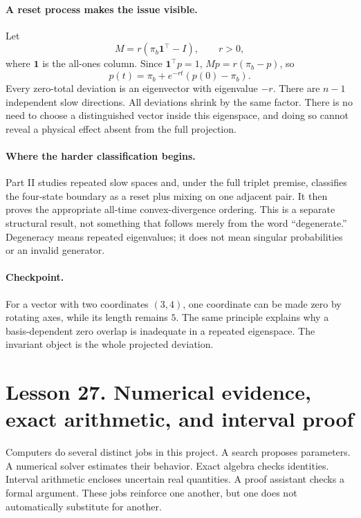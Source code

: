 \paragraph{A reset process makes the issue visible.}
Let
\[
M=r(\pi_b\mathbf1^\top-I),\qquad r>0,
\]
where $\mathbf1$ is the all-ones column. Since $\mathbf1^\top p=1$,
$Mp=r(\pi_b-p)$, so
\[
p(t)=\pi_b+e^{-rt}(p(0)-\pi_b).
\]
Every zero-total deviation is an eigenvector with eigenvalue $-r$.
There are $n-1$ independent slow directions. All deviations shrink by the
same factor. There is no need to choose a distinguished vector inside
this eigenspace, and doing so cannot reveal a physical effect absent from
the full projection.

\paragraph{Where the harder classification begins.}
Part II studies repeated slow spaces and, under the full triplet premise,
classifies the four-state boundary as a reset plus mixing on one adjacent
pair. It then proves the appropriate all-time convex-divergence ordering.
This is a separate structural result, not something that follows merely
from the word ``degenerate.'' Degeneracy means repeated eigenvalues;
it does not mean singular probabilities or an invalid generator.

\paragraph{Checkpoint.}
For a vector with two coordinates $(3,4)$, one coordinate can be made zero
by rotating axes, while its length remains $5$. The same principle explains
why a basis-dependent zero overlap is inadequate in a repeated eigenspace.
The invariant object is the whole projected deviation.

\clearpage
\section*{Lesson 27. Numerical evidence, exact arithmetic, and interval proof}
Computers do several distinct jobs in this project. A search proposes
parameters. A numerical solver estimates their behavior. Exact algebra
checks identities. Interval arithmetic encloses uncertain real quantities.
A proof assistant checks a formal argument. These jobs reinforce one
another, but one does not automatically substitute for another.

